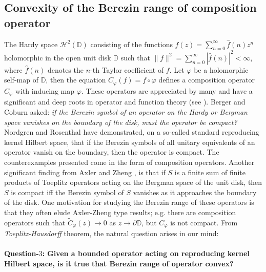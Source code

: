 \documentclass[12pt, reqno]{amsart}
\theoremstyle{definition}
\theoremstyle{remark}
\numberwithin{equation}{section}
\begin{document}
\subsection{Convexity of the Berezin range of composition operator}
The Hardy space  $\mathcal{H}^2(\mathbb{D})$ consisting of the functions $f(z)=\sum_{n=0}^\infty \widehat{f}(n)z^n$ holomorphic in the open unit disk $\mathbb{D}$ such that $\|f\|^2=\sum_{n=0}^\infty|\widehat{f}(n)|^2<\infty$, where $\widehat{f}(n)$ denotes the $n$-th Taylor coefficient of $f$. Let $\varphi$ be a holomorphic self-map of $\mathbb{D}$, then the equation $C_\varphi(f)=f\circ \varphi$ defines a composition operator $C_\varphi$ with inducing map $\varphi$. 
These operators are appreciated by many and have a significant and deep roots in operator and function theory (see \cite{Cowen_MacCluer_1995, Shapiro_1993}). Berger and Coburn \cite{Berger_Coburn_1986} asked: {\it if the Berezin symbol of an operator on the Hardy or Bergman space vanishes on the boundary of the disk, must the operator be compact? }
Nordgren and Rosenthal \cite{Nordgren_Rosenthal_1992} have demonstrated, on a so-called standard reproducing kernel Hilbert space, that if the Berezin symbols of all unitary equivalents of an operator vanish on the boundary, then the operator is compact. The counterexamples presented come in the form of composition operators.
Another significant finding from Axler and Zheng \cite{Axler_Zheng_1998}, is that if $S$ is a finite sum of finite products of Toeplitz operators acting on the Bergman space of the unit disk, then $S$ is compact iff the Berezin symbol of $S$ vanishes as it approaches the boundary of the disk. 
One motivation for studying the Berezin range of these operators is that they often elude  Axler-Zheng type results; e.g. there are composition operators such that $\widetilde{C}_\varphi(z) \rightarrow 0$ as $ z \rightarrow \partial \mathbb{D}$, but $C_\varphi$ is not compact.
From \textit{Toeplitz-Hausdorff} theorem, the natural question arises in our mind: \\ \\
{\bf Question-$3$:} {\bf Given a bounded operator acting on reproducing kernel Hilbert space, is it true that Berezin range of operator convex?}\\
\end{document}
